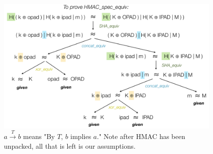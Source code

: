 \documentclass[twocolumn,showpacs,%
  nofootinbib,aps,superscriptaddress,%
  eqsecnum,prd,notitlepage,showkeys,10pt]{revtex4-1}
\begin{document}
\begin{figure}[h!]
	\centering
	\includegraphics[scale=0.45]{HMAC_spec_equiv}
	\caption{$a \xrightarrow{T} b$ means "By $T$, $b$ implies $a$." Note after HMAC has been unpacked, all that is left is our assumptions.}
\end{figure}
\end{document}
